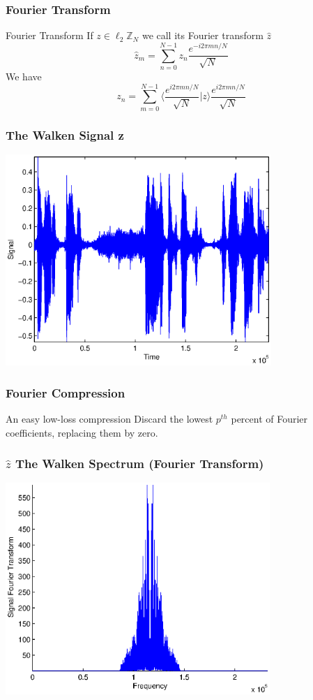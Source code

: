 \documentclass[10pt]{beamer}
\newcommand{\Z}{\mathbb{Z}}
\begin{document}
\begin{frame}
\frametitle{Fourier Transform}
\begin{block}
{Fourier Transform}
If $z \in \ell_2\Z_N$ we call its Fourier transform $\hat z$
$$
\hat z_m= \sum^{N-1}_{n=0} z_n \frac{e^{-i2\pi mn/N}}{\sqrt N}
$$
\pause We have
$$
z_n= \sum^{N-1}_{m=0} \langle \frac{e^{i2\pi mn/N}}{\sqrt N} | z \rangle \frac{e^{i2\pi mn/N}}{\sqrt N}
$$
\end{block}
\end{frame}

\begin{frame}
\frametitle{The Walken Signal z}
\includegraphics[height=8cm]{figure1.eps}
\end{frame}

\begin{frame}
\frametitle{Fourier Compression}
\begin{block}
{An easy low-loss compression}
Discard the lowest $p^{th}$ percent of Fourier coefficients, replacing them by zero.
\end{block}
\end{frame}

\begin{frame}
\frametitle{$\hat z$ The Walken Spectrum (Fourier Transform)}
\includegraphics[height=8cm]{Fourier.eps}
\end{frame}
\end{document}

